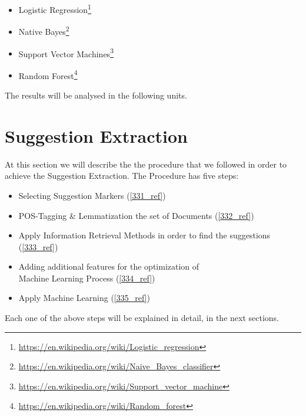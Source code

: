 \begin{itemize}

	\item Logistic Regression\footnote{\url{https://en.wikipedia.org/wiki/Logistic_regression}}
	\item Native Bayes\footnote{\url{https://en.wikipedia.org/wiki/Naive_Bayes_classifier}}
	\item Support Vector Machines\footnote{\url{https://en.wikipedia.org/wiki/Support_vector_machine}}
	\item Random Forest\footnote{\url{https://en.wikipedia.org/wiki/Random_forest}}\\

\end{itemize}
The results will be analysed in the following units.

\section{Suggestion Extraction}\label{33_ref}
At this section we will describe the the procedure that we followed in order to achieve the Suggestion Extraction. The Procedure has five steps:\\
\begin{itemize}

	\item Selecting Suggestion Markers (\ref{331_ref})
	\item POS-Tagging \& Lemmatization the set of Documents (\ref{332_ref})
	\item Apply Information Retrieval Methods in order to find the suggestions (\ref{333_ref}) 
	\item Adding additional features for the optimization of\\Machine Learning Process (\ref{334_ref})
	\item Apply Machine Learning (\ref{335_ref})\\

\end{itemize}
Each one of the above steps will be explained in detail, in the next sections.

